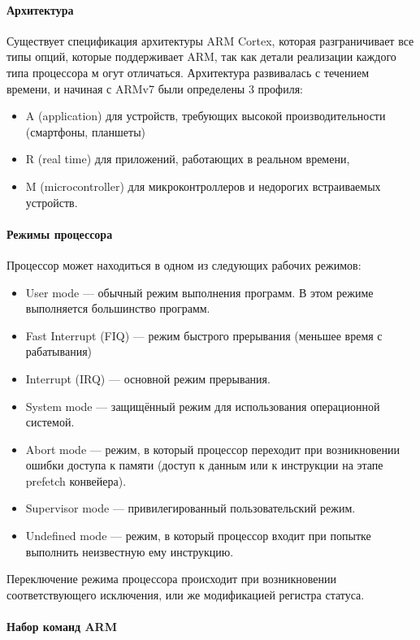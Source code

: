 \paragraph{Архитектура}

Существует спецификация архитектуры ARM Cortex, которая разграничивает все типы опций, 
которые поддерживает ARM, так как детали реализации каждого типа процессора м
огут отличаться. Архитектура развивалась с течением времени, и начиная с 
ARMv7 были определены 3 профиля:
\begin{itemize}
\item{A (application)} для устройств, требующих высокой производительности (смартфоны, планшеты)
\item{R (real time)} для приложений, работающих в реальном времени,
\item{M (microcontroller)} для микроконтроллеров и недорогих встраиваемых устройств.
\end{itemize}

\paragraph{Режимы процессора}

Процессор может находиться в одном из следующих рабочих режимов:
\begin{itemize}
\item{User mode} — обычный режим выполнения программ. В этом режиме 
выполняется большинство программ.
\item{Fast Interrupt (FIQ)} — режим быстрого прерывания (меньшее время с
рабатывания)
\item{Interrupt (IRQ)} — основной режим прерывания.
\item{System mode} — защищённый режим для использования операционной системой.
\item{Abort mode} — режим, в который процессор переходит при возникновении 
ошибки доступа к памяти (доступ к данным или к инструкции на этапе 
prefetch конвейера).
\item{Supervisor mode} — привилегированный пользовательский режим.
\item{Undefined mode} — режим, в который процессор входит при попытке 
выполнить неизвестную ему инструкцию.
\end{itemize}

Переключение режима процессора происходит при возникновении соответствующего 
исключения, или же модификацией регистра статуса.

\paragraph{Набор команд ARM}

